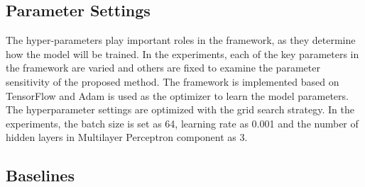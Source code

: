 \subsection{Parameter Settings}

The hyper-parameters play important roles in the framework, as they determine how the model will be
trained. In the experiments, each of the key parameters
in the framework are varied and others are fixed to examine the parameter sensitivity
of the proposed method. The framework is implemented based
on TensorFlow and Adam is used as the optimizer to learn the
model parameters. The hyperparameter settings are optimized with
the grid search strategy. In the experiments, the batch size is set
as 64, learning rate as 0.001 \newpage \noindent and the number of hidden layers in
Multilayer Perceptron component as 3.

\subsection{Baselines}

